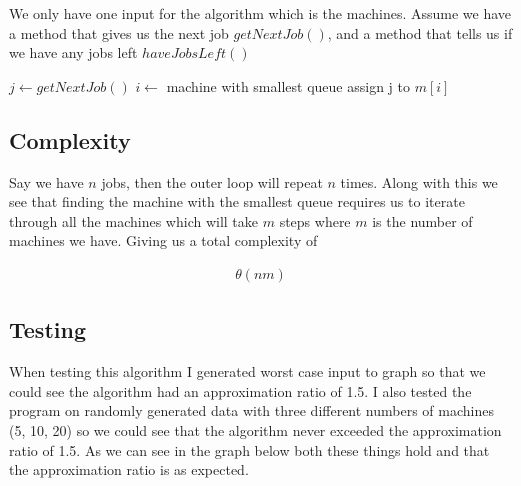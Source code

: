 \documentclass{article}
\begin{document}
			We only have one input for the algorithm which is the machines. Assume we have a method that gives us the next job $getNextJob()$, and a method that tells us if we have any jobs left $haveJobsLeft()$	
		
			\begin{algorithm}
				\begin{algorithmic}[1]
							\State $j \gets getNextJob()$
							\State $i \gets$ machine with smallest queue
							\State assign j to $m[i]$
						\EndWhile
					\EndProcedure
				\end{algorithmic}
			\end{algorithm}
	
		\subsection{Complexity}
			Say we have $n$ jobs, then the outer loop will repeat $n$ times. Along with this we see that finding the machine with the smallest queue requires us to iterate through all the machines which will take $m$ steps where $m$ is the number of machines we have. Giving us a total complexity of
			
			\begin{align*}
				\theta(nm)
			\end{align*}
					
		\subsection{Testing}
			When testing this algorithm I generated worst case input to graph so that we could see the algorithm had an approximation ratio of 1.5. I also tested the program on randomly generated data with three different numbers of machines (5, 10, 20) so we could see that the algorithm never exceeded the approximation ratio of 1.5. As we can see in the graph below both these things hold and that the approximation ratio is as expected.
			
\end{document}
